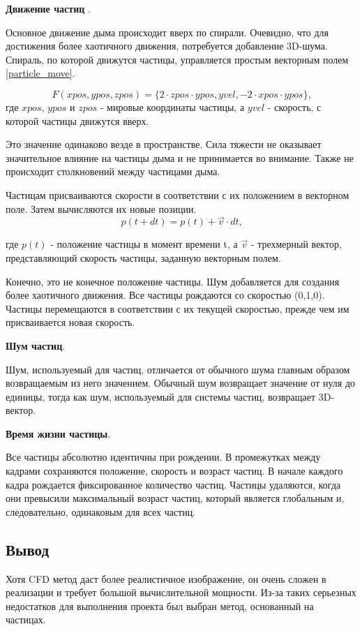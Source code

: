 \textbf{Движение частиц} \cite{smokeparticle}.

Основное движение дыма происходит вверх по спирали. Очевидно, что для достижения более хаотичного движения, потребуется добавление 3D-шума. Спираль, по которой движутся частицы, управляется простым векторным полем \ref{particle_move}.

\begin{equation}
	\label{particle_move}
	F(xpos,ypos,zpos) = \{ 2 \cdot zpos\cdot ypos,yvel,-2\cdot xpos\cdot ypos \} \text{,}
\end{equation}
где $xpos$, $ypos$ и $zpos$ - мировые координаты частицы, а $yvel$ - скорость, с которой частицы движутся вверх.

Это значение одинаково везде в пространстве. Сила тяжести не оказывает значительное влияние на частицы дыма и не принимается во внимание. Также не происходит столкновений между частицами дыма.

Частицам присваиваются скорости в соответствии с их положением в векторном поле. Затем вычисляются их новые позиции.
\begin{equation}
p(t + dt) = p(t) + \vec{v}\cdot dt\text{,}
\end{equation}

где $p(t)$ - положение частицы в момент времени t, а $\vec{v}$ - трехмерный вектор, представляющий скорость частицы, заданную векторным полем.
 
Конечно, это не конечное положение частицы. Шум добавляется для создания более хаотичного движения. Все частицы рождаются со скоростью (0,1,0). Частицы перемещаются в соответствии с их текущей скоростью, прежде чем им присваивается новая скорость.

\textbf{Шум частиц}.

Шум, используемый для частиц, отличается от обычного шума главным образом возвращаемым из него значением. Обычный шум возвращает значение от нуля до единицы, тогда как шум, используемый для системы частиц, возвращает 3D-вектор.
 
\textbf{Время жизни частицы}.

Все частицы абсолютно идентичны при рождении. В промежутках между кадрами сохраняются положение, скорость и возраст частиц. В начале каждого кадра рождается фиксированное количество частиц. Частицы удаляются, когда они превысили максимальный возраст частиц, который является глобальным и, следовательно, одинаковым для всех частиц.

\subsection*{Вывод}
Хотя CFD метод даст более реалистичное изображение, он очень сложен в реализации и требует большой вычислительной мощности. Из-за таких серьезных недостатков для выполнения проекта был выбран метод, основанный на частицах.

